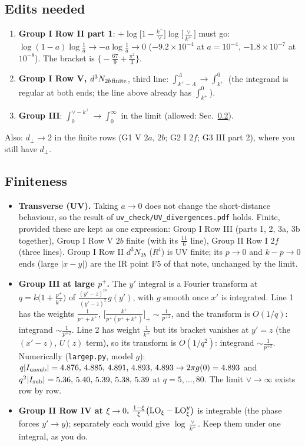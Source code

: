 \documentclass[10pt]{article}
\numberwithin{equation}{section}
\newcommand{\new}[1]{{\color{blue}#1}}
\newcommand{\old}[1]{{\color{red}#1}}
\newcommand{\LO}{{\rm LO}}
\begin{document}
\subsection{Edits needed}\label{sec:fix}
\begin{enumerate}
\item[E1] \textbf{Group I Row II part 1}: \old{$+\log\big[1-\frac{k^+}{\vee}\big]\log\big[\frac{\vee}{k^+}\big]$} must go: $\log(1-a)\log\frac1a\to-a\log\frac1a\to0$ ($-9.2\times10^{-4}$ at $a=10^{-4}$, $-1.8\times10^{-7}$ at $10^{-8}$). The bracket is $\big\{-\frac{67}{9}+\frac{\pi^2}{3}\big\}$.
\item[E2] \textbf{Group I Row V, $d^3N_{2b\,\rm finite}$}, third line: \old{$\int_{k^+-\Lambda}^{\Lambda}$}$\to$\new{$\int_{k^+}^{0}$} (the integrand is regular at both ends; the line above already has $\int_{k^+}^0$).
\item[E3] \textbf{Group III}: \old{$\int_0^{\vee-k^+}$}$\to$\new{$\int_0^{\infty}$} in the limit (allowed: Sec.~\ref{sec:conv}).
\end{enumerate}
Also: $d_\perp\to2$ in the finite rows (G1 V $2a$, $2b$; G2 I $2f$; G3 III part 2), where you still have $d_\perp$.

\subsection{Finiteness}\label{sec:conv}
\begin{itemize}
\item \textbf{Transverse (UV).} Taking $a\to0$ does not change the short-distance behaviour, so the result of \texttt{uv\_check/UV\_divergences.pdf} holds. Finite, provided these are kept as one expression: Group I Row III (parts 1, 2, 3a, 3b together), Group I Row V $2b$ finite (with its $\frac{11}{6}$ line), Group II Row I $2f$ (three lines). Group I Row II $d^3N_{2b}$ ($R^i$) is UV finite; its $p\to0$ and $k-p\to0$ ends (large $|x-y|$) are the IR point F5 of that note, unchanged by the limit.
\item \textbf{Group III at large $p^+$.} The $y'$ integral is a Fourier transform at $q=k\big(1+\frac{p^+}{k^+}\big)$ of $\frac{(y'-z)^m}{(y'-z)^2}g(y')$, with $g$ smooth once $x'$ is integrated. Line 1 has the weights $\frac{1}{p^++k^+}$, $\big[\frac{k^+}{p^+(p^++k^+)}\big]_+\sim\frac{1}{p^{+2}}$, and the transform is $O(1/q)$: integrand $\sim\frac{1}{p^{+2}}$. Line 2 has weight $\frac1{k^+}$ but its bracket vanishes at $y'=z$ (the $(x'-z)$, $U(z)$ term), so its transform is $O(1/q^2)$: integrand $\sim\frac{1}{p^{+2}}$. Numerically (\texttt{largep.py}, model $g$): $q|I_{\rm unsub}|=4.876,\,4.885,\,4.891,\,4.893,\,4.893\to2\pi g(0)=4.893$ and $q^2|I_{\rm sub}|=5.36,\,5.40,\,5.39,\,5.38,\,5.39$ at $q=5,\dots,80$. The limit $\vee\to\infty$ exists row by row.
\item \textbf{Group II Row IV at $\xi\to0$.} $\frac{1-\xi}{\xi}\big(\LO_\xi-\LO^y_\xi\big)$ is integrable (the phase forces $y'\to y$); separately each would give $\log\frac{\vee}{k^+}$. Keep them under one integral, as you do.
\end{itemize}
\end{document}
